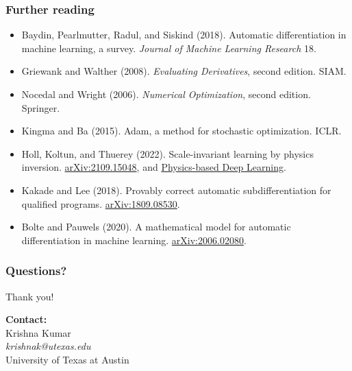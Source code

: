 \documentclass{beamer}
\begin{document}
\begin{frame}
\frametitle{Further reading}
\begin{itemize}
\item Baydin, Pearlmutter, Radul, and Siskind (2018). Automatic differentiation in machine learning, a survey. \textit{Journal of Machine Learning Research} 18.
\item Griewank and Walther (2008). \textit{Evaluating Derivatives}, second edition. SIAM.
\item Nocedal and Wright (2006). \textit{Numerical Optimization}, second edition. Springer.
\item Kingma and Ba (2015). Adam, a method for stochastic optimization. ICLR.
\item Holl, Koltun, and Thuerey (2022). Scale-invariant learning by physics inversion. \href{https://arxiv.org/abs/2109.15048}{arXiv:2109.15048}, and \href{https://www.physicsbaseddeeplearning.org/physgrad.html}{Physics-based Deep Learning}.
\item Kakade and Lee (2018). Provably correct automatic subdifferentiation for qualified programs. \href{https://arxiv.org/abs/1809.08530}{arXiv:1809.08530}.
\item Bolte and Pauwels (2020). A mathematical model for automatic differentiation in machine learning. \href{https://arxiv.org/abs/2006.02080}{arXiv:2006.02080}.
\end{itemize}
\end{frame}

\begin{frame}
\frametitle{Questions?}
\centering
\Large
Thank you!
\vspace{1cm}

\normalsize
\textbf{Contact:} \\
Krishna Kumar \\
\textit{krishnak@utexas.edu} \\
University of Texas at Austin
\end{frame}
\end{document}
